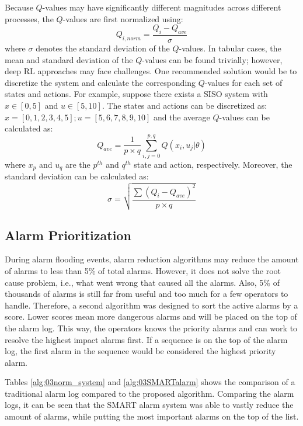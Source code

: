 Because $Q$-values may have significantly different magnitudes across different processes, the $Q$-values are first normalized using:
\begin{equation}
    Q_{i, norm} = \frac{Q_i - Q_{ave}}{\sigma}
\end{equation}
where $\sigma$ denotes the standard deviation of the $Q$-values.  In tabular cases, the mean and standard deviation of the $Q$-values can be found trivially; however, deep RL approaches may face challenges.  One recommended solution would be to discretize the system and calculate the corresponding $Q$-values for each set of states and actions.  For example, suppose there exists a SISO system with $x \in [0, 5]$ and $u \in [5, 10]$.  The states and actions can be discretized as: $x = [0, 1, 2, 3, 4, 5]; u = [5, 6, 7, 8, 9, 10]$ and the average $Q$-values can be calculated as:
\begin{equation}
    Q_{ave} = \frac{1}{p \times q} \sum_{i, j = 0}^{p, q} Q(x_i, u_j | \theta)
\end{equation}
where $x_p$ and $u_q$ are the $p^{th}$ and $q^{th}$ state and action, respectively. Moreover, the standard deviation can be calculated as:
\begin{equation}
    \sigma = \sqrt{\frac{\sum (Q_i - Q_{ave})^2}{p \times q}}
\end{equation}









\subsection{Alarm Prioritization}
During alarm flooding events, alarm reduction algorithms may reduce the amount of alarms to less than 5\% of total alarms.  However, it does not solve the root cause problem, i.e., what went wrong that caused all the alarms.  Also, 5\% of thousands of alarms is still far from useful and too much for a few operators to handle.  Therefore, a second algorithm was designed to sort the active alarms by a score.  Lower scores mean more dangerous alarms and will be placed on the top of the alarm log.  This way, the operators knows the priority alarms and can work to resolve the highest impact alarms first.  If a sequence is on the top of the alarm log, the first alarm in the sequence would be considered the highest priority alarm.

Tables \ref{alg:03norm_system} and \ref{alg:03SMARTalarm} shows the comparison of a traditional alarm log compared to the proposed algorithm.  Comparing the alarm logs, it can be seen that the SMART alarm system was able to vastly reduce the amount of alarms, while putting the most important alarms on the top of the list.

